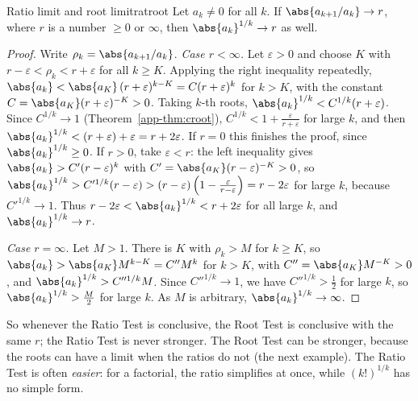 \documentclass[11pt]{article}
\begin{document}
\begin{thm}{Ratio limit and root limit}{ratroot}
Let $a_k\ne0$ for all $k$. If $\abs{a_{k+1}/a_k}\to r$, where $r$ is a number $\ge0$ or $\infty$, then $\abs{a_k}^{1/k}\to r$ as well.
\end{thm}
\begin{proof}
Write $\rho_k=\abs{a_{k+1}/a_k}$. \emph{Case $r<\infty$.} Let $\varepsilon>0$ and choose $K$ with $r-\varepsilon<\rho_k<r+\varepsilon$ for all $k\ge K$. Applying the right inequality repeatedly, $\abs{a_k}<\abs{a_K}\,(r+\varepsilon)^{k-K}=C(r+\varepsilon)^k$ for $k>K$, with the constant $C=\abs{a_K}(r+\varepsilon)^{-K}>0$. Taking $k$-th roots, $\abs{a_k}^{1/k}<C^{1/k}(r+\varepsilon)$. Since $C^{1/k}\to1$ (Theorem~\ref{app-thm:croot}), $C^{1/k}<1+\frac\varepsilon{r+\varepsilon}$ for large $k$, and then $\abs{a_k}^{1/k}<(r+\varepsilon)+\varepsilon=r+2\varepsilon$. If $r=0$ this finishes the proof, since $\abs{a_k}^{1/k}\ge0$. If $r>0$, take $\varepsilon<r$: the left inequality gives $\abs{a_k}>C'(r-\varepsilon)^k$ with $C'=\abs{a_K}(r-\varepsilon)^{-K}>0$, so $\abs{a_k}^{1/k}>C'^{1/k}(r-\varepsilon)>(r-\varepsilon)\left(1-\frac\varepsilon{r-\varepsilon}\right)=r-2\varepsilon$ for large $k$, because $C'^{1/k}\to1$. Thus $r-2\varepsilon<\abs{a_k}^{1/k}<r+2\varepsilon$ for all large $k$, and $\abs{a_k}^{1/k}\to r$.

\emph{Case $r=\infty$.} Let $M>1$. There is $K$ with $\rho_k>M$ for $k\ge K$, so $\abs{a_k}>\abs{a_K}M^{k-K}=C''M^k$ for $k>K$, with $C''=\abs{a_K}M^{-K}>0$, and $\abs{a_k}^{1/k}>C''^{1/k}M$. Since $C''^{1/k}\to1$, we have $C''^{1/k}>\frac12$ for large $k$, so $\abs{a_k}^{1/k}>\frac M2$ for large $k$. As $M$ is arbitrary, $\abs{a_k}^{1/k}\to\infty$.
\end{proof}

So whenever the Ratio Test is conclusive, the Root Test is conclusive with the same $r$; the Ratio Test is never stronger. The Root Test can be stronger, because the roots can have a limit when the ratios do not (the next example). The Ratio Test is often \emph{easier}: for a factorial, the ratio simplifies at once, while $(k!)^{1/k}$ has no simple form.
\end{document}
